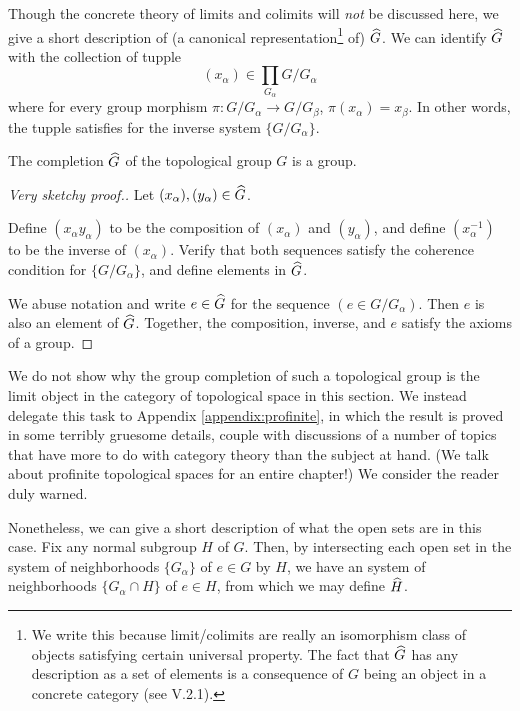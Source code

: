 Though the concrete theory of limits and colimits will \emph{not} 
be discussed here, we give a short description of (a canonical
representation\footnote{We write this because limit/colimits are
really an isomorphism class of objects satisfying certain universal
property. The fact that $\widehat{G}$ has any description as a set
of elements is a consequence of $G$ being an object in a concrete 
category (see \cite{ML} V.2.1).} of) $\widehat{G}$. We can 
identify $\widehat{G}$ with the collection of tupple 
\[
(x_\alpha) \in \prod_{G_\alpha} G/G_{\alpha}
\]
where for every group morphism $\pi : G/G_\alpha \to G/G_\beta$, 
$\pi(x_{\alpha}) = x_\beta$. In other words, the tupple satisfies
for the inverse system $\{G/G_\alpha\}$.

\begin{prop}\label{prop:group_compl_is_group}
The completion $\widehat{G}$ of the topological group $G$ is a 
group.
\end{prop}
\begin{proof}[Very sketchy proof.]
Let $(x_\alpha), (y_\alpha) \in \widehat{G}$.

Define $(x_\alpha y_\alpha)$ to be the composition of $(x_\alpha)$ 
and $(y_\alpha)$, and define $(x_\alpha^{-1})$ to be the inverse
of $(x_\alpha)$. Verify that both sequences satisfy the coherence
condition for $\{G/G_\alpha\}$, and define elements in 
$\widehat{G}$.

We abuse notation and write $e \in \widehat{G}$ for the sequence 
$(e \in G/G_\alpha)$. Then $e$ is also an element of $\widehat{G}$.
Together, the composition, inverse, and $e$ satisfy the axioms of
a group.
\end{proof}

We do not show why the group completion of such a topological 
group is the limit object in the category of topological space in
this section. We instead delegate this task to Appendix 
\ref{appendix:profinite}, in which the result is proved in some 
terribly gruesome details, couple with discussions of a number of
topics that have more to do with category theory than the subject
at hand. (We talk about profinite topological spaces for an entire 
chapter!) We consider the reader duly warned.

Nonetheless, we can give a short description of what the open sets
are in this case. Fix any normal subgroup $H$ of $G$. Then, by 
intersecting each open set in the system of neighborhoods 
$\{G_\alpha\}$ of $e \in G$ by $H$, we have an system of 
neighborhoods $\{G_\alpha \cap H\}$ of $e \in H$, from which we 
may define $\widehat{H}$.

